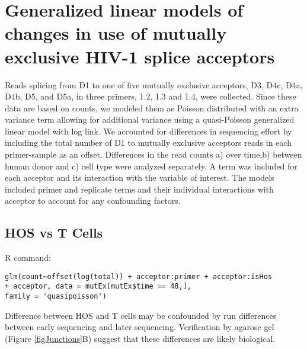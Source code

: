 \documentclass[../../sherrill-Mix_thesis.tex]{subfiles}
\begin{document}
\chapter{Generalized linear models of changes in use of mutually exclusive HIV-­1 splice acceptors}

\label{appPacbioReport}

Reads splicing from D1 to one of five mutually exclusive acceptors, D3, D4c, D4a, D4b, D5, and D5a, in three primers, 1.2, 1.3 and 1.4, were collected. Since these data are based on counts, we modeled them as Poisson distributed with an extra variance term allowing for additional variance using a quasi-Poisson generalized linear model with log link. We accounted for differences in sequencing effort by including the total number of D1 to mutually exclusive acceptors reads in each primer-sample as an offset. Differences in the read counts a) over time,b) between human donor and c) cell type were analyzed separately. A term was included for each acceptor and its interaction with the variable of interest. The models included primer and replicate terms and their individual interactions with acceptor to account for any confounding factors. 

\section{HOS vs T Cells}

R command:
\begin{lstlisting}[basicstyle=\ttfamily,breaklines=true]
glm(count~offset(log(total)) + acceptor:primer + acceptor:isHos
+ acceptor, data = mutEx[mutEx$time == 48,],
family = 'quasipoisson')
\end{lstlisting}

Difference between HOS and T cells may be confounded by run differences between early sequencing and later sequencing. Verification by agarose gel (Figure \ref{figJunctions}B) suggest that these differences are likely biological.

\end{document}
